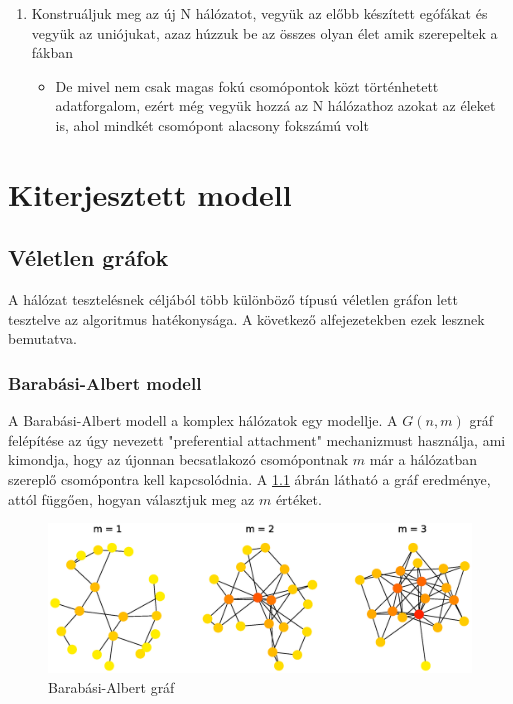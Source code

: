 \documentclass[12pt]{report}
\begin{document}
\begin{enumerate}
\begin{itemize}
	\end{itemize}
	\item Konstruáljuk meg az új N hálózatot, vegyük az előbb készített egófákat és vegyük az uniójukat, azaz húzzuk be az összes olyan élet amik szerepeltek a fákban
	\begin{itemize}
		\item     De mivel nem csak magas fokú csomópontok közt történhetett adatforgalom, ezért még vegyük hozzá az N hálózathoz azokat az éleket is, ahol mindkét csomópont alacsony fokszámú volt
	\end{itemize}
\end{enumerate}

\chapter{Kiterjesztett modell}

\section{Véletlen gráfok}

A hálózat tesztelésnek céljából több különböző típusú véletlen gráfon lett tesztelve az algoritmus hatékonysága.
A következő alfejezetekben ezek lesznek bemutatva.

\subsection{Barabási-Albert modell}

A Barabási-Albert modell \cite{RevModPhys.74.47} a komplex hálózatok egy modellje. 
A \(G(n, m)\) gráf felépítése az úgy nevezett "preferential attachment" mechanizmust használja, ami kimondja, hogy az újonnan becsatlakozó csomópontnak \(m\) már a hálózatban szereplő csomópontra kell kapcsolódnia. A \ref{barabasi} ábrán látható a gráf eredménye, attól függően, hogyan választjuk meg az \(m\) értéket.

\begin{figure}[H]
	\begin{center}
		\includegraphics[width=0.9\linewidth]{pictures/Barabasi_albert_graph.eps}
		\caption{Barabási-Albert gráf \cite{wikipedia_barabasi}}
		\label{barabasi}
	\end{center}
\end{figure}
\end{document}
